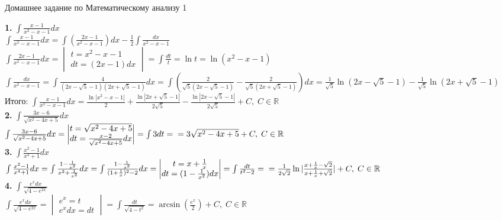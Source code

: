 \documentclass[14pt]{article}
\begin{document}
 
	\LARGE
	\begin{center}
		Домашнее задание по Математическому анализу 1
	\end{center}
	\textbf{1.} $\int \frac{x-1}{x^2-x-1}dx$ \\
	$\int \frac{x-1}{x^2-x-1} dx = \int(\frac{2x-1}{x^2-x-1})dx - \frac{1}{2} \int \frac{dx}{x^2-x-1}$ \\
	$\int \frac{2x-1}{x^2-x-1}dx = \begin{vmatrix}
		t=x^2-x-1 \\
		dt = (2x-1)dx
	\end{vmatrix} =  \int \frac{dt}{t} = \ln t = \ln(x^2-x-1)$ \\
	$\int \frac{dx}{x^2-x-1} = \int \frac{4}{(2x-\sqrt{5}-1)(2x+\sqrt{5}-1)}dx = \int (\frac{2}{\sqrt{5}(2x-\sqrt{5}-1)} - \frac{2}{\sqrt{5}(2x+\sqrt{5} -1)})dx = \frac{1}{\sqrt{5}}\ln(2x-\sqrt{5}-1) -\frac{1}{\sqrt{5}}\ln(2x+\sqrt{5}-1)$ \\
	Итого:
	$\int \frac{x-1}{x^2-x-1}dx = \frac{\ln|x^2-x-1|}{2} + \frac{\ln|2x+\sqrt{5}-1|}{2\sqrt{5}} - \frac{\ln|2x-\sqrt{5}-1|}{2\sqrt{5}}+C, \; C\in \mathbb{R}$ \\
	\textbf{2.} $\int \frac{3x-6}{\sqrt{x^2-4x+5}}dx$ \\ 
	$\int \frac{3x-6}{\sqrt{x^2-4x+5}}dx = \begin{vmatrix}
		t=\sqrt{x^2-4x+5} \\
		dt = \frac{x-2}{\sqrt{x^2-4x+5}}dx
	\end{vmatrix} = \int 3dt =  \\ =3\sqrt{x^2-4x+5} + C, \; C \in \mathbb{R}$ \\
	\textbf{3.} $\int \frac{x^2-1}{x^4+1}dx$ \\
	$\int \frac{x^2-1}{x^4+1}dx = \int \frac{1-\frac{1}{x^2}}{x^2 + \frac{1}{x^2}}dx = \int \frac{1-\frac{1}{x^2}}{(1+\frac{1}{x})^2-2}dx = \begin{vmatrix}
		t=x+\frac{1}{x} \\
		dt = (1- \frac{1}{x^2})dx
	\end{vmatrix} = \int \frac{dt}{t^2-2} = \\
	=\frac{1}{2\sqrt{2}}\ln|\frac{x+\frac{1}{x}-\sqrt{2}}{x+\frac{1}{x}+\sqrt{2}}| + C, \; C \in \mathbb{R}$ \\
	\textbf{4.} $\int \frac{e^xdx}{\sqrt{4-e^{2x}}}$ \\
	$\int \frac{e^xdx}{\sqrt{4-e^{2x}}}	= \begin{vmatrix}
		e^x = t \\
		e^x dx= dt  
	\end{vmatrix} = \int \frac{dt}{\sqrt{4-t^2}}=\arcsin(\frac{e^x}{2})+C,\; C \in \mathbb{R}$ \\
\end{document}
